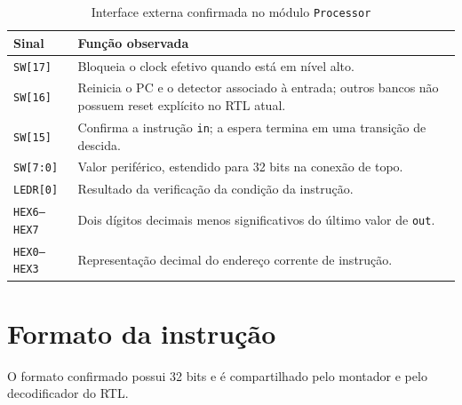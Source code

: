 \documentclass[
  12pt,
  oneside,
  a4paper,
  english,
  french,
  spanish,
  brazilian,
]{abntex2}
\begin{document}
\begin{table}[H]
\centering
\ABNTEXfontereduzida
\caption{Interface externa confirmada no módulo \texttt{Processor}}
\label{tab:interface}
\begin{tabular}{|p{}|p{}|}
\hline
\textbf{Sinal} & \textbf{Função observada} \\
\hline
\texttt{SW[17]} & Bloqueia o clock efetivo quando está em nível alto. \\
\hline
\texttt{SW[16]} & Reinicia o PC e o detector associado à entrada; outros bancos não possuem reset explícito no RTL atual. \\
\hline
\texttt{SW[15]} & Confirma a instrução \texttt{in}; a espera termina em uma transição de descida. \\
\hline
\texttt{SW[7:0]} & Valor periférico, estendido para 32 bits na conexão de topo. \\
\hline
\texttt{LEDR[0]} & Resultado da verificação da condição da instrução. \\
\hline
\texttt{HEX6--HEX7} & Dois dígitos decimais menos significativos do último valor de \texttt{out}. \\
\hline
\texttt{HEX0--HEX3} & Representação decimal do endereço corrente de instrução. \\
\hline
\end{tabular}
\end{table}

\section{Formato da instrução}

O formato confirmado possui 32 bits e é compartilhado pelo montador e pelo decodificador do RTL.
\end{document}
